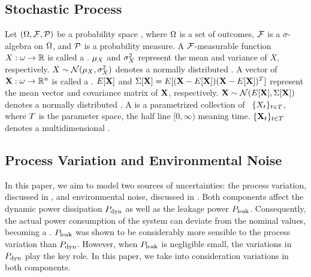 \subsection{Stochastic Process}
Let $(\Omega, \mathcal{F}, \mathcal{P})$ be a probability space \cite{durrett2010}, where $\Omega$ is a set of outcomes, $\mathcal{F}$ is a $\sigma$-algebra on $\Omega$, and $\mathcal{P}$ is a probability measure. A $\mathcal{F}$-measurable function $X: \omega \to \mathbb{R}$ is called a . $\mu_{X}$ and $\sigma_{X}^2$ represent the mean and variance of $X$, respectively. $X \sim \mathcal{N}(\mu_{X}, \sigma_{X}^2)$ denotes a normally distributed \rv. A vector of \rvs\ $\mathbf{X}: \omega \to \mathbb{R}^n$ is called a . $E[\mathbf{X}]$ and $\Sigma[\mathbf{X}] = E[(\mathbf{X} - E[\mathbf{X}])(\mathbf{X} - E[\mathbf{X}])^T]$ represent the mean vector and covariance matrix of $\mathbf{X}$, respectively. $\mathbf{X} \sim \mathcal{N}(E[\mathbf{X}], \Sigma[\mathbf{X}])$ denotes a normally distributed \mrv. A  is a parametrized collection of \rvs\ $\{ X_t \}_{t \in T}$, where $T$ is the parameter space, the half line $[0, \infty)$ meaning time. $\{ \mathbf{X}_t \}_{t \in T}$ denotes a multidimensional \sp.

\subsection{Process Variation and Environmental Noise} 
In this paper, we aim to model two sources of uncertainties: the process variation, discussed in , and environmental noise, discussed in . Both components affect the dynamic power dissipation $P_{\text{dyn}}$ as well as the leakage power $P_{\text{leak}}$. Consequently, the actual power consumption of the system can deviate from the nominal values, becoming a \rv. $P_{\text{leak}}$ was shown to be considerably more sensible to the process variation than $P_{\text{dyn}}$. However, when $P_{\text{leak}}$ is negligible small, the variations in $P_{\text{dyn}}$ play the key role. In this paper, we take into consideration variations in both components.
